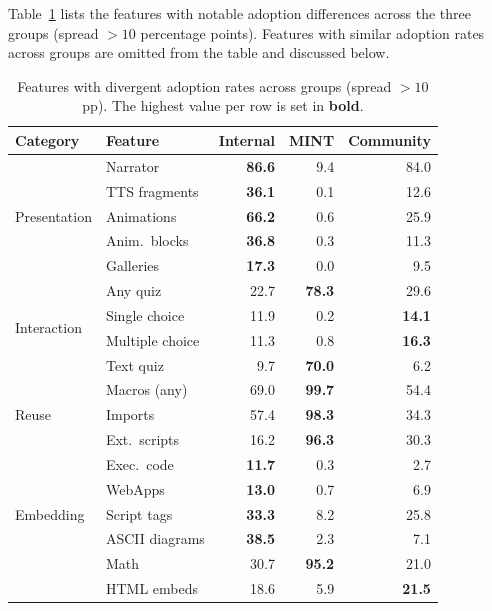 Table~\ref{tab:group_diff} lists the features with notable adoption
differences across the three groups (spread $> 10$ percentage points).
Features with similar adoption rates across groups are omitted from the table
and discussed below.

\begin{table}[ht]
  \centering
  \caption{Features with divergent adoption rates across groups
           (spread $> 10$ pp).  The highest value per row is set in
           \textbf{bold}.}
  \label{tab:group_diff}
  \begin{tabular}{llrrr}
    \toprule
    \textbf{Category} & \textbf{Feature} &
      \textbf{Internal} & \textbf{MINT} & \textbf{Community} \\
    \midrule
    \multirow{5}{*}{\textcolor{catPresentation}{Presentation}}
      & Narrator       & \textbf{86.6} &  9.4 & 84.0 \\
      & TTS fragments  & \textbf{36.1} &  0.1 & 12.6 \\
      & Animations     & \textbf{66.2} &  0.6 & 25.9 \\
      & Anim.\ blocks  & \textbf{36.8} &  0.3 & 11.3 \\
      & Galleries      & \textbf{17.3} &  0.0 &  9.5 \\
    \midrule
    \multirow{4}{*}{\textcolor{catInteraction}{Interaction}}
      & Any quiz       & 22.7 & \textbf{78.3} & 29.6 \\
      & Single choice  & 11.9 &  0.2 & \textbf{14.1} \\
      & Multiple choice& 11.3 &  0.8 & \textbf{16.3} \\
      & Text quiz      &  9.7 & \textbf{70.0} &  6.2 \\
    \midrule
    \multirow{3}{*}{\textcolor{catReuse}{Reuse}}
      & Macros (any)   & 69.0 & \textbf{99.7} & 54.4 \\
      & Imports        & 57.4 & \textbf{98.3} & 34.3 \\
      & Ext.\ scripts  & 16.2 & \textbf{96.3} & 30.3 \\
    \midrule
    \multirow{5}{*}{\textcolor{catEmbedding}{Embedding}}
      & Exec.\ code    & \textbf{11.7} &  0.3 &  2.7 \\
      & WebApps        & \textbf{13.0} &  0.7 &  6.9 \\
      & Script tags    & \textbf{33.3} &  8.2 & 25.8 \\
      & ASCII diagrams & \textbf{38.5} &  2.3 &  7.1 \\
      & Math           & 30.7 & \textbf{95.2} & 21.0 \\
      & HTML embeds    & 18.6 &  5.9 & \textbf{21.5} \\
    \bottomrule
  \end{tabular}
\end{table}

